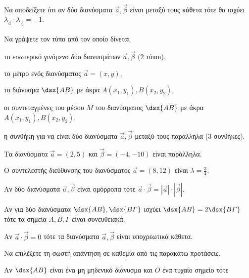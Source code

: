 \documentclass[twoside,nofonts,ektypwsh,math,spyros]{frontisthrio-diag}
\begin{document}
\begin{thema}
\item \mbox{}\\\vspace{-5mm}\begin{erwthma}
\item Να αποδείξετε ότι αν δύο διανύσματα $ \vec{a},\vec{\beta} $ είναι μεταξύ τους κάθετα τότε θα ισχύει $ \lambda_{\vec{a}}\cdot\lambda_{\vec{\beta}}=-1 $. \\
\item Να γράψετε τον τύπο από τον οποίο δίνεται
\begin{rlist}
\item το εσωτερικό γινόμενο δύο διανυσμάτων $ \vec{a},\vec{\beta} $ (2 τύποι),
\item το μέτρο ενός διανύσματος $ \vec{a}=(x,y) $,
\item το διάνυσμα $ \dsx{AB} $ με άκρα $ A(x_1,y_1), B(x_2,y_2) $,
\item οι συντεταγμένες του μέσου $ M $ του διανύσματος $ \dsx{AB} $ με άκρα $ A(x_1,y_1), B(x_2,y_2) $,
\item η συνθήκη για να είναι δύο διανύσματα $ \vec{a},\vec{\beta} $ μεταξύ τους παράλληλα (3 συνθήκες).
\end{rlist}
\item \swstolathos
\begin{rlist}
\item Τα διανύσματα $ \vec{a}=(2,5) $ και $ \vec{\beta}=(-4,-10) $ είναι παράλληλα.
\item Ο συντελεστής διεύθυνσης του διανύσματος $ \vec{a}=(8,12) $ είναι $ \lambda=\frac{3}{4} $.
\item Αν δύο διανύσματα $ \vec{a},\vec{\beta} $ είναι ομόρροπα τότε $ \vec{a}\cdot\vec{\beta}=|\vec{a}|\cdot|\vec{\beta}| $.
\item Αν για δύο διανύσματα $ \dsx{AB},\dsx{B\varGamma} $ ισχύει $ \dsx{AB}=2\dsx{B\varGamma} $ τότε τα σημεία $ A,B,\varGamma $ είναι συνευθειακά.
\item Αν $ \vec{a}\cdot\vec{\beta}=0 $ τότε τα διανύσματα $ \vec{a},\vec{\beta} $ είναι υποχρεωτικά κάθετα. 
\end{rlist}
\item Να επιλέξετε τη σωστή απάντηση σε καθεμία από τις παρακάτω προτάσεις.
\begin{rlist}
\item Αν $ \dsx{AB} $ είναι ένα μη μηδενικό διάνυσμα και $ Ο $ ένα τυχαίο σημείο τότε

\end{rlist}
\end{erwthma}
\end{thema}
\end{document}
